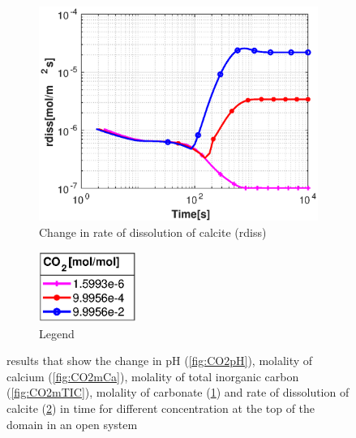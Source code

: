 \begin{figure}[!h]
\begin{subfigure}{.5\linewidth}
        \label{fig:CO2mCO3}
    \end{subfigure}%
    \hfill
    \begin{subfigure}{.5\linewidth}
            \centering
        \includegraphics[width=\textwidth]{PICTURES/with_CO2_rdiss.eps}
        \caption{Change in rate of dissolution of calcite (rdiss)}
        \label{fig:CO2rdiss}
    \end{subfigure}%
    \hfill
    \begin{subfigure}{.5\linewidth}
            \centering
        \includegraphics[width=0.35\textwidth]{PICTURES/with_CO2_legend.eps}
        \caption{Legend}
        \label{fig:CO2legend}
    \end{subfigure}%
    \caption{\DuMuX results that show the change in pH (\cref{fig:CO2pH}), molality of calcium (\cref{fig:CO2mCa}), molality of total inorganic carbon (\cref{fig:CO2mTIC}), molality of carbonate (\cref{fig:CO2mCO3}) and rate of dissolution of calcite (\cref{fig:CO2rdiss}) in time for different  concentration at the top of the domain in an open system}
    \label{fig:diffCO2}
\end{figure}

